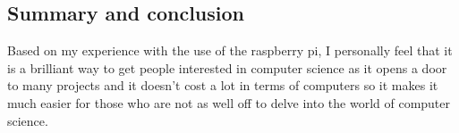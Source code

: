 \documentclass{article}
\begin{document}
	\subsection{Summary and conclusion}
	Based on my experience with the use of the raspberry pi, I personally feel that it is a brilliant way to get people interested in computer science as it opens a door to many projects and it doesn't cost a lot in terms of computers so it makes it much easier for those who are not as well off to delve into the world of computer science. 
	\newpage
	
	
\end{document}
